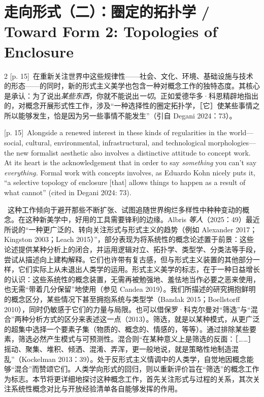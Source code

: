 \documentclass[10pt,a4paper]{article}
\begin{document}
\section*{走向形式（二）：圈定的拓扑学 / Toward Form 2: Topologies of Enclosure}
\begin{paracol}{2}
{\scriptsize\color{gray} [p. 15]}\ 在重新关注世界中这些规律性——社会、文化、环境、基础设施与技术的形态——的同时，新的形式主义美学也包含一种对概念工作的独特态度。其核心是承认：为了说出\textit{某些东西}，你就不能说出\textit{一切}。正如爱德华多·科恩精辟地指出的，对概念开展形式性工作，涉及“一种选择性的圈定拓扑学，［它］使某些事情之所以能够发生，恰是因为另一些事情不能发生”（引自 Degani 2024：73）。\par
\switchcolumn
{\scriptsize\color{gray} [p. 15]}\ Alongside a renewed interest in these kinds of regularities in the world—social, cultural, environmental, infrastructural, and technological morphologies—the new formalist aesthetic also involves a distinctive attitude to concept work. At its heart is the acknowledgement that in order to say \textit{something} you can’t say \textit{everything.} Formal work with concepts involves, as Eduardo Kohn nicely puts it, “a selective topology of enclosure [that] allows things to happen as a result of what cannot” (cited in Degani 2024: 73).\par
\switchcolumn*
{\scriptsize\color{gray} [p. 15]}\ 这种工作倾向于避开那些不断扩张、试图追随世界绚烂多样性中种种变动的概念。在这种新美学中，好用的工具需要锋利的边缘。Albris \textit{等人}（2025：49）最近所说的“一种更广泛的、转向关注形式与形式主义的趋势（例如 Alexander 2017；Kingston 2003；Leach 2015）”，部分表现为将系统性的概念论述置于前景：这些论述提供某种分析上的闭合，并运用逻辑对立、拓扑学、类型学、分类法等手段，尝试从描述向上建构解释。它们也许带有复古感，但与形式主义装置的其他部分一样，它们实际上从未退出人类学的运用。形式主义美学的标志，在于一种日益增长的认识：这些系统性的概念装置，无需再被勉强地、羞怯地当作必要之恶来使用，也无需“带着几分保留”地使用（参见 Candea 2019）。我们所描述的研究拥抱鲜明的概念区分，某些情况下甚至拥抱系统与类型学（Bandak 2015；Boellstorff 2010），同时仍敏感于它们的力量与局限。也可以借保罗·科克尔曼对“筛选”与“混合”两种分析方式的区分来表述这一点（2013）。筛选，就是以某种模式，从更广泛的超集中选择一个要素子集（物质的、概念的、情感的，等等）。通过排除某些要素，筛选必然产生模式与可预测性。混合则“在某种意义上是筛选的反面：［……］摇动、聚集、堆积、倾洒、混淆、弄浑，更一般地说，就是策略性地制造混乱”（Kockelman 2013：39）。处于反形式主义情调中的人类学，自觉地因概念能够“混合”而赞颂它们。人类学向形式的回归，则以重新评价旨在“筛选”的概念工作为标志。本节将更详细地探讨这种概念工作，首先关注形式与过程的关系，其次关注系统性概念对比与开放经验清单各自能够发挥的作用。\par

\end{paracol}
\end{document}
